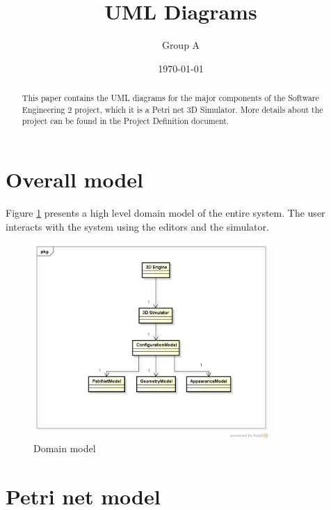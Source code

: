 \documentclass[11pt]{article}   %
\title{UML Diagrams\\ \epns}
\author{Group A}
\date{\today}
\begin{document}
\maketitle

\begin{abstract}
This paper contains the UML diagrams for the major components of the Software Engineering 2 project, which it is a Petri net 3D Simulator. More details about the project can be found in the Project Definition document.
\end{abstract}

\tableofcontents \newpage

\section{Overall model}

Figure \ref{fig:domain-model} presents a high level domain model of the entire system. The user interacts with the system using the editors and the simulator.

\begin{figure}[htp]
\begin{center}
  \includegraphics[width=0.8\textwidth]{image/domain_model.png}
  \caption{Domain model}
  \label{fig:domain-model}
\end{center}
\end{figure}

\newpage
\section{Petri net model}
\end{document}
